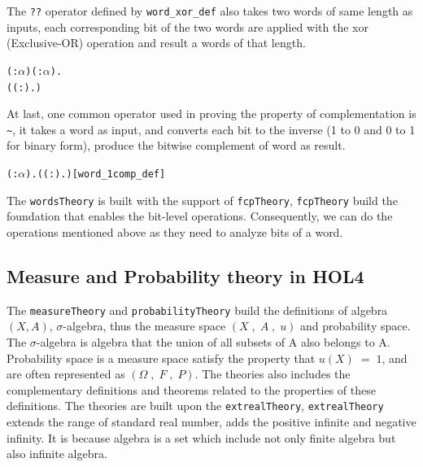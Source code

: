 \documentclass{article}
\begin{document}
The \verb|??| operator defined by \verb|word_xor_def| also takes two words of same length as inputs,
each corresponding bit of the two words are applied with the xor (Exclusive-OR) operation
and result a words of that length.

\begin{alltt}
\HOLTokenTurnstile{} \HOLSymConst{\HOLTokenForall{}}( :\ensuremath{\alpha} ) ( :\ensuremath{\alpha} ).
      \HOLSymConst{\HOLTokenEor{}}  \HOLSymConst{=} (( :).    \HOLSymConst{\HOLTokenNotEquiv{}}   )
\end{alltt}

At last, one common operator used in proving the property of complementation is \verb|~|, it takes a word as input, and converts
each bit to the inverse (1 to 0 and 0 to 1 for binary form), produce the bitwise complement of word as result.

\begin{alltt}
\HOLTokenTurnstile{} \HOLSymConst{\HOLTokenForall{}}( :\ensuremath{\alpha} ). \HOLSymConst{\HOLTokenNeg{}} \HOLSymConst{=} (( :). \HOLSymConst{\HOLTokenNeg{}}  )\hfill{[word_1comp_def]}
\end{alltt}

The \verb|wordsTheory| is built with the support of \verb|fcpTheory|, \verb|fcpTheory| build the foundation that enables the bit-level operations.
Consequently, we can do the operations mentioned above as they need to analyze bits of a word.

\subsection{Measure and Probability theory in HOL4}

The \verb|measureTheory| and \verb|probabilityTheory| build the definitions of algebra $(X,A)$, $\sigma$-algebra, thus the measure space
$(X\;,\;A\;,\;u)$ and probability
space. The $\sigma$-algebra is algebra that the union of all subsets of A also belongs to A. Probability space is a measure space satisfy the
property that $u(X)\;=\;1$, and are often represented as $(\Omega\;,\; F\;,\; P)$. The theories also includes the complementary definitions and
theorems related to the properties of these definitions. The theories are built upon the \verb|extrealTheory|, \verb|extrealTheory|
extends the range of standard real number, adds the positive infinite and negative infinity. It is because algebra is a set which
include not only finite algebra but also infinite algebra.
\end{document}
